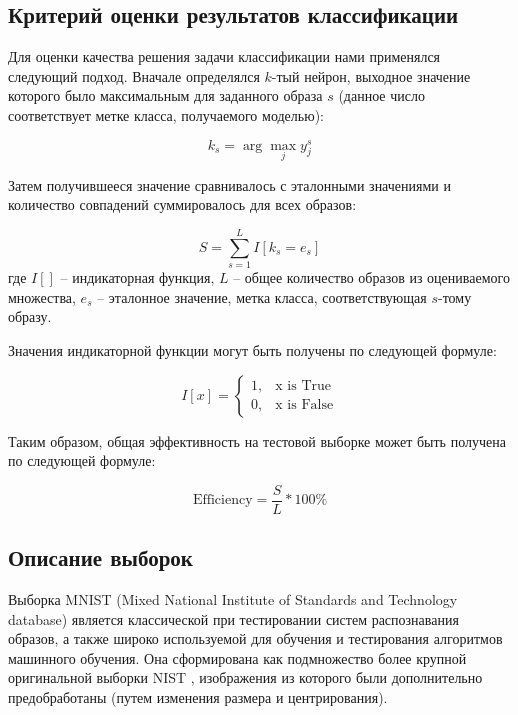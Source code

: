 \subsection{Критерий оценки результатов классификации}

Для оценки качества решения задачи классификации нами применялся следующий подход. Вначале определялся $k$-тый нейрон, выходное значение которого было максимальным для заданного образа $s$ (данное число соответствует метке класса, получаемого моделью):

\begin{equation}
k_s = \arg \max_j y_j^s
\end{equation}

Затем получившееся значение сравнивалось с эталонными значениями и количество совпадений суммировалось для всех образов:

\begin{equation}
S = \sum_{s=1}^{L} I[k_s = e_s]
\end{equation}
где $I[]$ -- индикаторная функция, $L$ -- общее количество образов из оцениваемого множества, $e_s$ -- эталонное значение, метка класса, соответствующая $s$-тому образу.

Значения индикаторной функции могут быть получены по следующей формуле:

\begin{equation*}
    I[x] = 
    \begin{cases}
        1, & \text{x is True} \\
        0, & \text{x is False}
    \end{cases}
\end{equation*}

Таким образом, общая эффективность на тестовой выборке может быть получена по следующей формуле:

\begin{equation}
\text{Efficiency} = \frac{S}{L} * 100\%
\end{equation}


\subsection{Описание выборок}

Выборка MNIST (Mixed National Institute of Standards and Technology database) является классической при тестировании систем распознавания образов, а также широко используемой для обучения и тестирования алгоритмов машинного обучения. Она сформирована как подмножество более крупной оригинальной выборки NIST \cite{mnist}, изображения из которого были дополнительно предобработаны (путем изменения размера и центрирования). 

